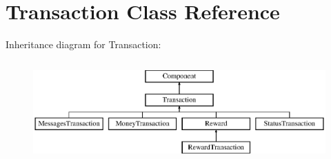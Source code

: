 \hypertarget{classTransaction}{}\section{Transaction Class Reference}
\label{classTransaction}
Inheritance diagram for Transaction\+:\begin{figure}[H]
\begin{center}
\leavevmode
\includegraphics[height=3.916084cm]{classTransaction}
\end{center}
\end{figure}
